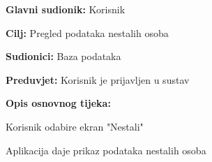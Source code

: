 				    \noindent {}
					\begin{packed_item}
	
						\item \textbf{Glavni sudionik: }Korisnik
						\item  \textbf{Cilj:} Pregled podataka nestalih osoba
						\item  \textbf{Sudionici:} Baza podataka
						\item  \textbf{Preduvjet:} Korisnik je prijavljen u sustav
						\item  \textbf{Opis osnovnog tijeka:}
						
						\item[] \begin{packed_enum}
	
							\item Korisnik odabire ekran "Nestali"
							\item Aplikacija daje prikaz podataka nestalih osoba
						\end{packed_enum}
						
					
					\end{packed_item}
					
